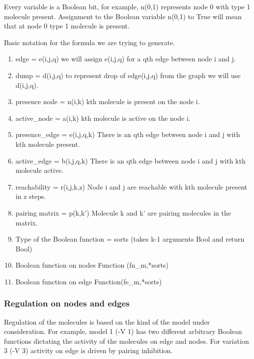 Every variable is a Boolean bit, for example, n(0,1) represents node 0
with type 1 molecule present. Assignment to the Boolean variable
n(0,1) to True will mean that at node 0 type 1 molecule is present. 

Basic notation for the formula we are trying to generate.
\begin{enumerate}

\item edge = e(i,j,q)      
      we will assign e(i,j,q) for a qth edge between node i and j.

\item dump = d(i,j,q)
      to represent drop of edge(i,j,q) from the graph we will use d(i,j,q).        
       
\item presence node = n(i,k) 
	  kth molecule is present on the node i.
      
\item active\_node = a(i,k) 
      kth molecule is active on the node i.
      
\item presence\_edge = e(i,j,q,k)
      There is an qth edge between node i and j with kth molecule present.

\item active\_edge = b(i,j,q,k)
      There is an qth edge between node i and j with kth molecule active.

\item reachability = r(i,j,k,z)
      Node i and j are reachable with kth molecule present in z steps.

\item pairing matrix = p(k,k')
      Molecule k and k' are pairing molecules in the matrix.

\item Type of the Boolean function = sorts (takes k-1 arguments Bool and return Bool) 
\item Boolean function on nodes Function (fn\_{m},*sorts) 

\item Boolean function on edge Function(fe\_{m},*sorts)

\end{enumerate}

\subsubsection{Regulation on nodes and edges}
Regulation of the molecules is based on the kind of the model under consideration. For example, model 1 (-V 1) has two different arbitrary Boolean functions dictating the activity of the molecules on edge and nodes. For variation 3 (-V 3) activity on edge is driven by pairing inhibition.  

